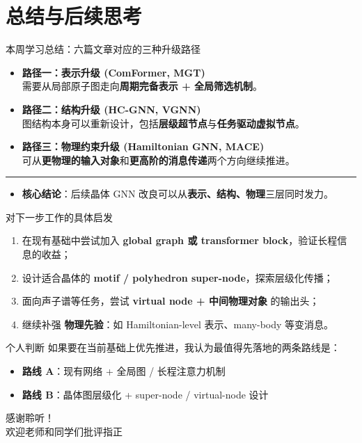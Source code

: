 \documentclass{beamer}
\begin{document}
\section{总结与后续思考}

\begin{frame}[shrink]{本周学习总结：六篇文章对应的三种升级路径}
\small
\begin{itemize}
  \item \textbf{路径一：表示升级 (ComFormer, MGT)}\\
        需要从局部原子图走向\textbf{周期完备表示 + 全局筛选机制}。
  \vspace{1.5mm}
  \item \textbf{路径二：结构升级 (HC-GNN, VGNN)}\\
        图结构本身可以重新设计，包括\textbf{层级超节点}与\textbf{任务驱动虚拟节点}。
  \vspace{1.5mm}
  \item \textbf{路径三：物理约束升级 (Hamiltonian GNN, MACE)}\\
        可从\textbf{更物理的输入对象}和\textbf{更高阶的消息传递}两个方向继续推进。
\end{itemize}

\vspace{1.5mm}
\hrule
\vspace{1.5mm}

\begin{itemize}
  \item \textbf{核心结论}：后续晶体 GNN 改良可以从\textbf{表示、结构、物理}三层同时发力。
\end{itemize}
\end{frame}

\begin{frame}[shrink]{对下一步工作的具体启发}
\begin{enumerate}
  \item 在现有基础中尝试加入 \textbf{global graph 或 transformer block}，验证长程信息的收益；
  \item 设计适合晶体的 \textbf{motif / polyhedron super-node}，探索层级化传播；
  \item 面向声子谱等任务，尝试 \textbf{virtual node + 中间物理对象} 的输出头；
  \item 继续补强 \textbf{物理先验}：如 Hamiltonian-level 表示、many-body 等变消息。
\end{enumerate}

\vspace{1.5mm}
\begin{alertblock}{个人判断}
如果要在当前基础上优先推进，我认为最值得先落地的两条路线是：
\begin{itemize}
  \item \textbf{路线 A}：现有网络 + 全局图 / 长程注意力机制
  \item \textbf{路线 B}：晶体图层级化 + super-node / virtual-node 设计
\end{itemize}
\end{alertblock}
\end{frame}

\begin{frame}
\centering
\Huge 感谢聆听！\\[4mm]
\large 欢迎老师和同学们批评指正
\end{frame}
\end{document}

